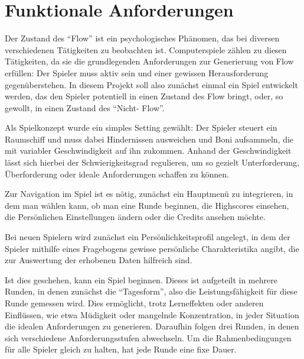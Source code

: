 \documentclass[a4paper,12pt]{scrartcl}
\begin{document}


% 
% 
% 
% 



\tableofcontents
\clearpage



\clearpage


\section{Funktionale Anforderungen}
Der Zustand des "`Flow"' ist ein psychologisches Phänomen, das bei diversen verschiedenen
Tätigkeiten zu beobachten ist. Computerspiele zählen zu diesen Tätigkeiten, da sie die
grundlegenden Anforderungen zur Generierung von Flow erfüllen: Der Spieler muss aktiv
sein und einer gewissen Herausforderung gegenüberstehen.
In diesem Projekt soll also zunächst einmal ein Spiel entwickelt werden, das den Spieler
potentiell in einen Zustand des Flow bringt, oder, so gewollt, in einen Zustand des "`Nicht-
Flow"'.

Als Spielkonzept wurde ein simples Setting gewählt: Der Spieler steuert ein Raumschiff
und muss dabei Hindernissen ausweichen und Boni aufsammeln, die mit variabler
Geschwindigkeit auf ihn zukommen. Anhand der Geschwindigkeit lässt sich hierbei der
Schwierigkeitsgrad regulieren, um so gezielt Unterforderung, Überforderung oder ideale
Anforderungen schaffen zu können.

Zur Navigation im Spiel ist es nötig, zunächst ein Hauptmenü zu integrieren, in dem man
wählen kann, ob man eine Runde beginnen, die Highscores einsehen, die Persönlichen
Einstellungen ändern oder die Credits ansehen möchte.

Bei neuen Spielern wird zunächst ein Persönlichkeitsprofil angelegt, in dem der Spieler
mithilfe eines Fragebogens gewisse persönliche Charakteristika angibt, die zur Auswertung
der erhobenen Daten hilfreich sind.

Ist dies geschehen, kann ein Spiel beginnen. Dieses ist aufgeteilt in mehrere Runden, in
denen zunächst die "`Tagesform"', also die Leistungsfähigkeit für diese Runde gemessen
wird. Dies ermöglicht, trotz Lerneffekten oder anderen Einflüssen, wie etwa Müdigkeit oder
mangelnde Konzentration, in jeder Situation die idealen Anforderungen zu generieren.
Daraufhin folgen drei Runden, in denen sich verschiedene Anforderungsstufen abwechseln.
Um die Rahmenbedingungen für alle Spieler gleich zu halten, hat jede Runde eine fixe
Dauer.
\end{document}
